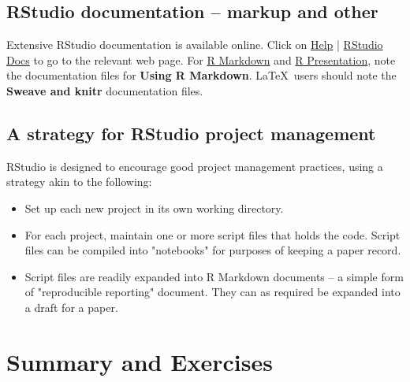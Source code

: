 \documentclass{tufte-book}\usepackage[]{graphicx}\usepackage[]{color}
\begin{document}
\subsection{RStudio documentation -- markup and other}

Extensive RStudio documentation is available online.  Click on
\underline{Help} | \underline{RStudio Docs} to go to the relevant web
page. For \underline{R Markdown} and \underline{R Presentation}, note
the documentation files for {\bf Using R Markdown}.  \LaTeX\ users
should note the {\bf Sweave and knitr} documentation files.

\subsection{A strategy for RStudio project management}

RStudio is designed to encourage good project management practices,
using a strategy akin to the following:
\begin{itemize}
\item[] Set up each new project in its own working directory.
\item[] For each project, maintain one or more script files that
holds the code.  Script files can be compiled into "notebooks"
for purposes of keeping a paper record.
\item[] Script files are readily expanded into R Markdown documents
-- a simple form of "reproducible reporting" document.  They can
as required be expanded into a draft for a paper.
\end{itemize}


\section{Summary and Exercises}
\end{document}
